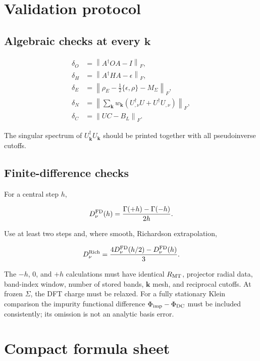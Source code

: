 \documentclass[11pt]{article}
\numberwithin{equation}{section}
\newcommand{\kb}{\mathbf k}
\newcommand{\norm}[1]{\left\lVert #1\right\rVert}
\begin{document}
\section{Validation protocol}

\subsection{Algebraic checks at every $\kb$}

\begin{align}
 \delta_O&=\norm{A^\dagger OA-I}_F,\\
 \delta_H&=\norm{A^\dagger HA-\epsilon}_F,\\
 \delta_E&=\norm{\rho_E-\tfrac12\{\epsilon,\rho\}-M_\Sigma}_F,\\
 \delta_N&=\norm{\sum_\kb w_\kb(U_{,\nu}^\dagger U+U^\dagger U_{,\nu})}_F,\\
 \delta_C&=\norm{UC-B_L}_F.
\end{align}

The singular spectrum of $U_\kb^\dagger U_\kb$ should be printed together
with all pseudoinverse cutoffs.

\subsection{Finite-difference checks}

For a central step $h$,

\begin{equation}
 D_\nu^{\rm FD}(h)
 =\frac{\Gamma(+h)-\Gamma(-h)}{2h}.
\end{equation}

Use at least two steps and, where smooth, Richardson extrapolation,

\begin{equation}
 D_\nu^{\rm Rich}
 =\frac{4D_\nu^{\rm FD}(h/2)-D_\nu^{\rm FD}(h)}{3}.
\end{equation}

The $-h$, $0$, and $+h$ calculations must have identical $R_{\rm MT}$,
projector radial data, band-index window, number of stored bands, $\kb$ mesh,
and reciprocal cutoffs.  At frozen $\Sigma$, the DFT charge must be relaxed.
For a fully stationary Klein comparison the impurity functional difference
$\Phi_{\rm imp}-\Phi_{\rm DC}$ must be included consistently; its omission is
not an analytic basis error.

\section{Compact formula sheet}
\end{document}
